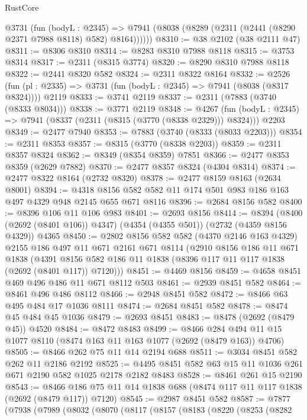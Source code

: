 \begin{lexlean}{RustCore}
\begin{coremodule}
      @3731
        (fun (bodyL : @2345) =>
        @7941 (@8038 (@8289 (@2311 (@2441 (@8290 @2371 @7988 @8118) @582) @8164))))))
@8310 := @38 @2102 (@38 @2111 @47)
@8311 := @8306 @8310
@8314 := @8283 @8310 @7988 @8118
@8315 := @3753 @8314
@8317 := @2311 (@8315 @3774)
@8320 := @8290 @8310 @7988 @8118
@8322 := @2441 @8320 @582
@8324 := @2311 @8322 @8164
@8332 := @2526
    (fun (pl : @2335) => @3731 (fun (bodyL : @2345) => @7941 (@8038 (@8317 @8324))))
    @2119
@8333 := @3741 @2119
@8337 := @2311 (@7883 (@3740 (@8333 @8034)))
@8338 := @3771 @2119
@8348 := @4267
    (fun (bodyL : @2345) => @7941 (@8337 (@2311 (@8315 (@3770 (@8338 @2329))) @8324)))
    @2203
@8349 := @2477 @7940
@8353 := @7883 (@3740 (@8333 (@8033 @2203)))
@8354 := @2311 @8353
@8357 := @8315 (@3770 (@8338 @2203))
@8359 := @2311 @8357 @8324
@8362 := @8349 (@8354 @8359) @7851
@8366 := @2477 @8353 @8359 (@2629 @7882)
@8370 := @2477 @8357 @8324 (@4304 @8314)
@8374 := @2477 @8322 @8164 (@2732 @8320)
@8378 := @2477 @8159 @8163 (@2634 @8001)
@8394 := @4318 @8156 @582 @582 @11 @174 @501 @983 @186 @163 @497 @4329 @948 @2145 @655 @671 @8116
@8396 := @2684 @8156 @582
@8400 := @8396 @106 @11 @106 @983
@8401 := @2693 @8156
@8414 := @8394
    (@8400 (@2692 (@8401 @106)) @4347)
    (@4354 (@4355 @501))
    (@2732 (@4359 @8156 @4329))
    @4365
@8450 := @2802
    @8156
    @582
    @582
    (@4370 @2146 @163 @4329)
    @2155
    @186
    @497
    @11
    @671
    @2161
    @671
    @8114
    (@2910
      @8156
      @186
      @11
      @671
      @1838
      (@4391 @8156 @582 @186 @11 @1838 (@8396 @117 @11 @117 @1838 (@2692 (@8401 @117)) @7120)))
@8451 := @4469 @8156
@8459 := @4658 @8451 @469 @496 @486 @11 @671 @8112 @503
@8461 := @2939 @8451 @582
@8464 := @8461 @496 @486 @8112
@8466 := @2948 @8451 @582
@8472 := @8466 @63 @495 @484 @17 @1036 @8111
@8474 := @2684 @8451 @582
@8478 := @8474 @45 @484 @45 @1036
@8479 := @2693 @8451
@8483 := @8478 (@2692 (@8479 @45)) @4520
@8484 := @8472 @8483
@8499 := @8466 @284 @494 @11 @15 @1077 @8110 (@8474 @163 @11 @163 @1077 (@2692 (@8479 @163)) @4706)
@8505 := @8466 @262 @75 @11 @14 @2194 @688
@8511 := @3034 @8451 @582 @262 @11 @2186 @2192
@8525 := @4495 @8451 @582 @63 @15 @11 @1036 @261 @671 @2190 @582 @1025 @2178 @2182 @8483
@8528 := @8461 @261 @15 @2190
@8543 := @8466 @186 @75 @11 @14 @1838 @688 (@8474 @117 @11 @117 @1838 (@2692 (@8479 @117)) @7120)
@8545 := @2987 @8451 @582
@8587 := @7877
    (@7938
      (@7989
        (@8032
          (@8070
            (@8117
              (@8157
                (@8183
                  (@8220
                    (@8253
                      (@8282

\end{coremodule}
\end{lexlean}
